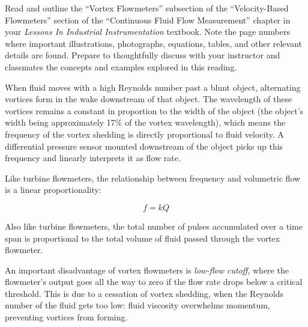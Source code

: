 

Read and outline the ``Vortex Flowmeters'' subsection of the ``Velocity-Based Flowmeters'' section of the ``Continuous Fluid Flow Measurement'' chapter in your {\it Lessons In Industrial Instrumentation} textbook.  Note the page numbers where important illustrations, photographs, equations, tables, and other relevant details are found.  Prepare to thoughtfully discuss with your instructor and classmates the concepts and examples explored in this reading.














When fluid moves with a high Reynolds number past a blunt object, alternating vortices form in the wake downstream of that object.  The wavelength of these vortices remains a constant in proportion to the width of the object (the object's width being approximately 17\% of the vortex wavelength), which means the frequency of the vortex shedding is directly proportional to fluid velocity.  A differential pressure sensor mounted downstream of the object picks up this frequency and linearly interprets it as flow rate.

\vskip 10pt

Like turbine flowmeters, the relationship between frequency and volumetric flow is a linear proportionality:

$$f = kQ$$

Also like turbine flowmeters, the total number of pulses accumulated over a time span is proportional to the total volume of fluid passed through the vortex flowmeter.

\vskip 10pt

An important disadvantage of vortex flowmeters is {\it low-flow cutoff}, where the flowmeter's output goes all the way to zero if the flow rate drops below a critical threshold.  This is due to a cessation of vortex shedding, when the Reynolds number of the fluid gets too low: fluid viscosity overwhelms momentum, preventing vortices from forming.









